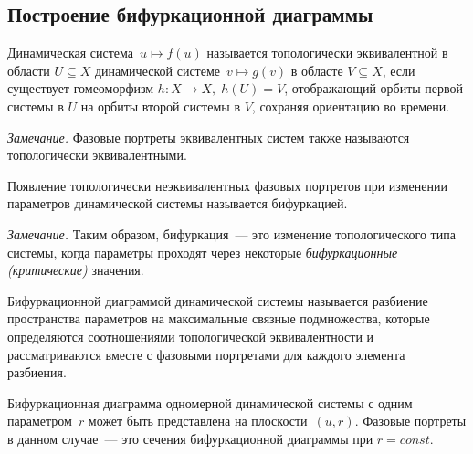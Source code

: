 \subsection{Построение бифуркационной диаграммы}
            
\begin{definition}
        Динамическая система~$u \mapsto f(u)$ называется топологически эквивалентной в области $U \subseteq X$ динамической системе~$v \mapsto g(v)$ в областе $V \subseteq X$, если существует гомеоморфизм $h:X\rightarrow X,\; h(U) = V$, отображающий орбиты первой системы в $U$ на орбиты второй системы в $V$, сохраняя ориентацию во времени. \cite[стр.~396]{bratus10}
\end{definition}
\textit{Замечание.} Фазовые портреты эквивалентных систем также называются топологически эквивалентными.

\begin{definition}
        Появление топологически неэквивалентных фазовых портретов при изменении параметров динамической системы называется бифуркацией. \cite[стр.~25]{bratus10}
\end{definition}
\textit{Замечание.} Таким образом, бифуркация~--- это изменение топологического типа системы, когда параметры проходят через некоторые \textit{бифуркационные (критические)} значения. \cite[стр.~25]{bratus10}

\begin{definition}
        Бифуркационной диаграммой динамической системы называется разбиение пространства параметров на максимальные связные подмножества, которые определяются соотношениями топологической эквивалентности и рассматриваются вместе с фазовыми портретами для каждого элемента разбиения. \cite[стр.~27]{bratus10}
\end{definition}

Бифуркационная диаграмма одномерной динамической системы с одним параметром~$r$ может быть представлена на плоскости~$(u, r)$. Фазовые портреты в данном случае~--- это сечения бифуркационной диаграммы при $r = const$.

